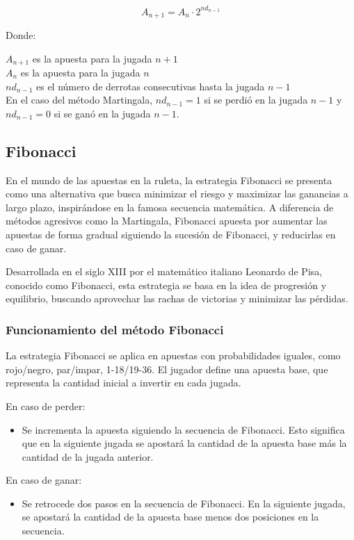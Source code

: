 \documentclass{article}
\begin{document}
\[ A_{n+1} = A_n \cdot 2^{nd_{n-1}} \]

Donde:

$A_{n+1}$ es la apuesta para la jugada $n+1$ \\
$A_n$ es la apuesta para la jugada $n$ \\
$nd_{n-1}$ es el número de derrotas consecutivas hasta la jugada $n-1$ \\
En el caso del método Martingala, $nd_{n-1} = 1$ si se perdió en la jugada $n-1$ y $nd_{n-1} = 0$ si se ganó en la jugada $n-1$.

\subsection{Fibonacci}
En el mundo de las apuestas en la ruleta, la estrategia Fibonacci se presenta como una alternativa que busca minimizar el riesgo y maximizar las ganancias a largo plazo, inspirándose en la famosa secuencia matemática. A diferencia de métodos agresivos como la Martingala, Fibonacci apuesta por aumentar las apuestas de forma gradual siguiendo la sucesión de Fibonacci, y reducirlas en caso de ganar.

Desarrollada en el siglo XIII por el matemático italiano Leonardo de Pisa, conocido como Fibonacci, esta estrategia se basa en la idea de progresión y equilibrio, buscando aprovechar las rachas de victorias y minimizar las pérdidas.

\subsubsection{Funcionamiento del método Fibonacci}

La estrategia Fibonacci se aplica en apuestas con probabilidades iguales, como rojo/negro, par/impar, 1-18/19-36. El jugador define una apuesta base, que representa la cantidad inicial a invertir en cada jugada.

En caso de perder:

\begin{itemize}
    \item Se incrementa la apuesta siguiendo la secuencia de Fibonacci. Esto significa que en la siguiente jugada se apostará la cantidad de la apuesta base más la cantidad de la jugada anterior.
\end{itemize}

En caso de ganar:

\begin{itemize}
    \item Se retrocede dos pasos en la secuencia de Fibonacci. En la siguiente jugada, se apostará la cantidad de la apuesta base menos dos posiciones en la secuencia.
\end{itemize}
\end{document}
